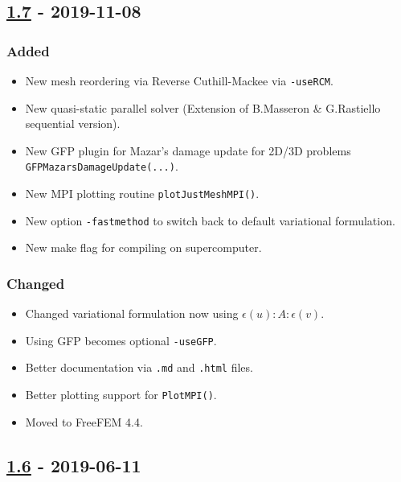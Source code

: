 \subsection{\texorpdfstring{\href{https://gitlab.com/PsdSolver/psd_sources/-/tree/v1.7}{1.7}
- 2019-11-08}{1.7 - 2019-11-08}}\label{section-4}

\subsubsection{Added}\label{added-5}

\begin{itemize}
\tightlist
\item
  New mesh reordering via Reverse Cuthill-Mackee via
  \lstinline!-useRCM!.
\item
  New quasi-static parallel solver (Extension of B.Masseron \&
  G.Rastiello sequential version).
\item
  New GFP plugin for Mazar's damage update for 2D/3D problems
  \lstinline!GFPMazarsDamageUpdate(...)!.
\item
  New MPI plotting routine \lstinline!plotJustMeshMPI()!.
\item
  New option \lstinline!-fastmethod! to switch back to default
  variational formulation.
\item
  New make flag for compiling on supercomputer.
\end{itemize}

\subsubsection{Changed}\label{changed-5}

\begin{itemize}
\tightlist
\item
  Changed variational formulation now using
  \(\epsilon(u):A:\epsilon(v)\).
\item
  Using GFP becomes optional \lstinline!-useGFP!.
\item
  Better documentation via \lstinline!.md! and \lstinline!.html! files.
\item
  Better plotting support for \lstinline!PlotMPI()!.
\item
  Moved to FreeFEM 4.4.
\end{itemize}

\subsection{\texorpdfstring{\href{https://gitlab.com/PsdSolver/psd_sources/-/tree/v1.6}{1.6}
- 2019-06-11}{1.6 - 2019-06-11}}\label{section-5}

